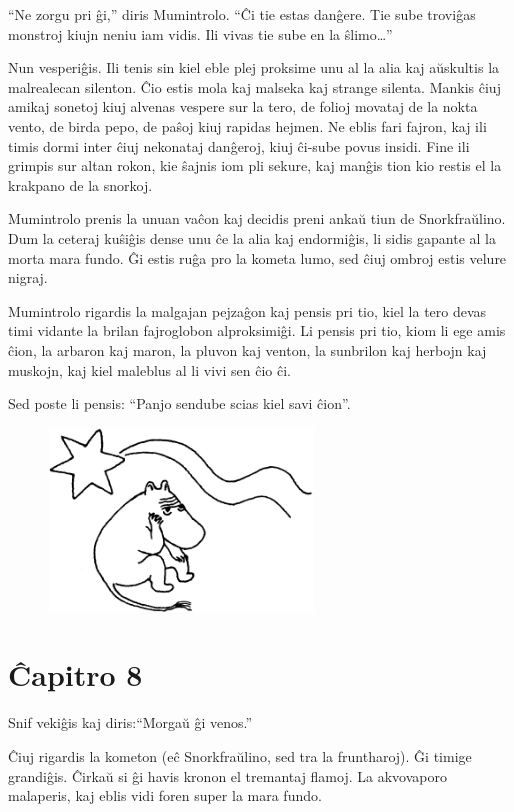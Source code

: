 ``Ne zorgu pri ĝi,'' diris Mumintrolo. ``Ĉi tie estas danĝere. Tie sube troviĝas monstroj kiujn neniu iam vidis. Ili vivas tie sube en la ŝlimo{\ldots}''

Nun vesperiĝis. Ili tenis sin kiel eble plej proksime unu al la alia kaj aŭskultis la malrealecan silenton. Ĉio estis mola kaj malseka kaj strange silenta. Mankis ĉiuj amikaj sonetoj kiuj alvenas vespere sur la tero, de folioj movataj de la nokta vento, de birda pepo, de paŝoj kiuj rapidas hejmen. Ne eblis fari fajron, kaj ili timis dormi inter ĉiuj nekonataj danĝeroj, kiuj ĉi-sube povus insidi. Fine ili grimpis sur altan rokon, kie ŝajnis iom pli sekure, kaj manĝis tion kio restis el la krakpano de la snorkoj.

Mumintrolo prenis la unuan vaĉon kaj decidis preni ankaŭ tiun de Snorkfraŭlino. Dum la ceteraj kuŝiĝis dense unu ĉe la alia kaj endormiĝis, li sidis gapante al la morta mara fundo. Ĝi estis ruĝa pro la kometa lumo, sed ĉiuj ombroj estis velure nigraj.

Mumintrolo rigardis la malgajan pejzaĝon kaj pensis pri tio, kiel la tero devas timi vidante la brilan fajroglobon alproksimiĝi. Li pensis pri tio, kiom li ege amis ĉion, la arbaron kaj maron, la pluvon kaj venton, la sunbrilon kaj herbojn kaj muskojn, kaj kiel maleblus al li vivi sen ĉio ĉi.

Sed poste li pensis: ``Panjo sendube scias kiel savi ĉion''.

\begin{figure}[htbp]
\centering
\includegraphics[width=200pt,height=138pt]{7-9.png}
\caption{}
\label{7-9}
\end{figure}

\chapter[Ĉapitro 8]{Ĉapitro 8}

Snif vekiĝis kaj diris:``Morgaŭ ĝi venos.''

Ĉiuj rigardis la kometon (eĉ Snorkfraŭlino, sed tra la fruntharoj). Ĝi timige grandiĝis. Ĉirkaŭ si ĝi havis kronon el tremantaj flamoj. La akvovaporo malaperis, kaj eblis vidi foren super la mara fundo.

